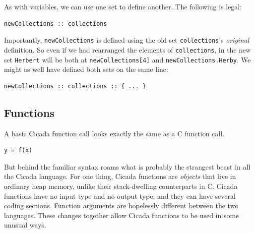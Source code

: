\documentclass{article}
\newenvironment{code}{
       \begin{list}{}{
               \setlength{\leftmargin}{.4in}
               \setlength{\rightmargin}{0in}
               \setlength{\topsep}{.2in}
       }
       \small
       \item[] }
       { \end{list}   }
\begin{document}
As with variables, we can use one set to define another.  The following is legal:

\begin{code} \begin{verbatim}
newCollections :: collections
\end{verbatim} \end{code}

\noindent Importantly, \verb#newCollections# is defined using the old set \verb#collections#'s \emph{original} definition.  So even if we had rearranged the elements of \verb#collections#, in the new set \verb#Herbert# will be both at \verb#newCollections[4]# and \verb#newCollections.Herby#.  We might as well have defined both sets on the same line:

\begin{code} \begin{verbatim}
newCollections :: collections :: { ... }
\end{verbatim} \end{code}










\subsection{Functions} 

A basic Cicada function call looks exactly the same as a C function call.

\begin{code} \begin{verbatim}
y = f(x)
\end{verbatim} \end{code}

\noindent But behind the familiar syntax roams what is probably the strangest beast in all the Cicada language.  For one thing, Cicada functions are \emph{objects} that live in ordinary heap memory, unlike their stack-dwelling counterparts in C.  Cicada functions have no input type and no output type, and they can have several coding sections.  Function arguments are hopelessly different between the two languages.  These changes together allow Cicada functions to be used in some unusual ways.



\end{document}
